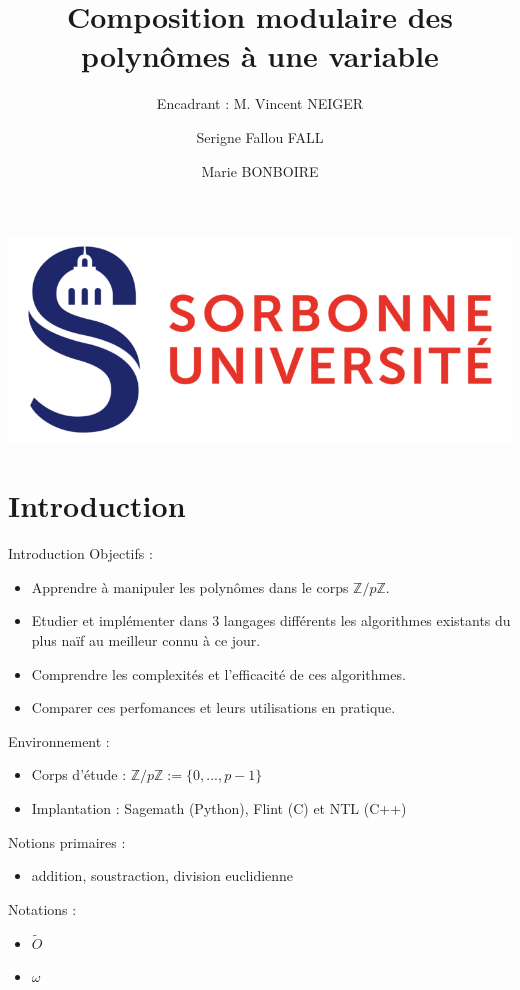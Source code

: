 \documentclass[10pt,a4paper]{beamer}
\title[Center text]{\textbf{Composition modulaire des polynômes à une variable}}
\subtitle{\small{Encadrant : M. Vincent NEIGER}}
\author{Serigne Fallou FALL \and Marie BONBOIRE}
\date{}
\begin{document}
\begin{frame}[plain]
	\begin{center} 
		\includegraphics[scale=0.3]{logo_su.jpg}
    \end{center}
    \titlepage
\end{frame}

\begin{frame}
    \tableofcontents
\end{frame}

\section{Introduction}
\begin{frame}{Introduction}
    Objectifs :
    \begin{itemize}
        \item Apprendre à manipuler les polynômes dans le corps ${\mathbb{Z}/p \mathbb{Z}}$.
        \item Etudier et implémenter dans 3 langages différents les algorithmes existants du plus naïf au meilleur connu à ce jour.
        \item Comprendre les complexités et l'efficacité de ces algorithmes. 
        \item Comparer ces perfomances et leurs utilisations en pratique.
    \end{itemize}

    Environnement :
    \begin{itemize}
        \item Corps d'étude : $\mathbb{Z}/p\mathbb{Z} := \{0, ..., p-1\}$
        \item Implantation : Sagemath (Python), Flint (C) et NTL (C++)  
    \end{itemize}

    Notions primaires :
    \begin{itemize}
        \item addition, soustraction, division euclidienne
    \end{itemize}

    Notations  :
    \begin{itemize}
        \item $\tilde{O}$
        \item $\omega$
    \end{itemize}
\end{frame}
\end{document}
